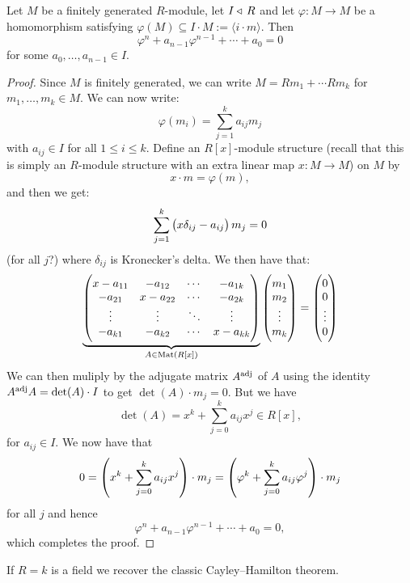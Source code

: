 \documentclass[11pt,a4paper]{article}
\begin{document}
\begin{theorem}
  Let $M$ be a finitely generated $R$-module,
  let $I \triangleleft\, R$
  and let $\varphi \colon M \to M$ be a homomorphism
  satisfying $\varphi(M) \subseteq I \cdot M := \langle i \cdot m \rangle$.
  Then
  \[
    \varphi^n + a_{n-1} \varphi^{n-1} + \cdots + a_0 = 0
  \]
  for some $a_0,\dots,a_{n-1} \in I$.
\end{theorem}
\begin{proof}
  Since $M$ is finitely generated,
  we can write $M = R m_1 + \cdots R m_k$
  for $m_1,\dots,m_k \in M$.
  We can now write:
  \[
    \varphi(m_i) =
    \sum_{j=1}^{k} a_{ij} m_j
  \]
  with $a_{ij} \in I$ for all $1 \le i \le k$.
  Define an $R[x]$-module structure (recall that this
  is simply an $R$-module structure with an extra
  linear map $x \colon M \to M$)
  on $M$ by
  \[
    x \cdot m = \varphi(m),
  \]
  and then we get:
  \[
    \sum_{j=1}^{k} \del{x \delta_{ij} - a_{ij}} m_j = 0
  \]
  (for all $j$?)
  where $\delta_{ij}$ is Kronecker's delta.
  We then have that:
  \[
    \underbrace{\begin{pmatrix}
      x-a_{11} & -a_{12} & \cdots & -a_{1k} \\
      -a_{21} & x-a_{22} & \cdots & -a_{2k} \\
             \vdots  & \vdots & \ddots & \vdots \\
      -a_{k1} & -a_{k2} & \cdots & x-a_{kk}
    \end{pmatrix}}_{A \in \operatorname{Mat}(R[x])}
    \begin{pmatrix}
      m_1 \\ m_2 \\ \vdots \\ m_k
    \end{pmatrix} =
    \begin{pmatrix}
      0 \\ 0 \\ \vdots \\ 0
    \end{pmatrix}
  \]
  We can then muliply by the adjugate matrix $A^{\operatorname{adj}}$ of $A$
  using the identity $A^{\operatorname{adj}} A = \det(A) \cdot I$ to
  get $\det(A) \cdot m_j = 0$.
  But we have
  \[
    \det(A) =
    x^k + \sum_{j=0}^{k} a_{ij} x^j \in R[x],
  \]
  for $a_{ij} \in I$.
  We now have that
  \[
    0 =
    \del{x^k + \sum_{j=0}^{k} a_{ij} x^j} \cdot m_j =
    \del{\varphi^k + \sum_{j=0}^{k} a_{ij} \varphi^j} \cdot m_j
  \]
  for all $j$ and hence 
  \[
    \varphi^n + a_{n-1} \varphi^{n-1} + \cdots + a_0 = 0,
  \]
  which completes the proof.
\end{proof}
\begin{remark}
  If $R = k$ is a field we recover the classic Cayley--Hamilton
  theorem.
\end{remark}
\end{document}
